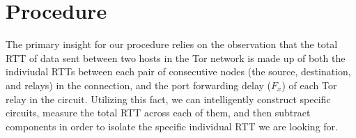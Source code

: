 \documentclass[twocolumn,11pt]{article}
\begin{document}
\section{Procedure}

The primary insight for our procedure relies on the observation that the total RTT of data sent between two hosts in the Tor network is made up of both the indiviudal RTTs between each pair of consecutive nodes (the source, destination, and relays) in the connection, and the port forwarding delay ($F_x$) of each Tor relay in the circuit. Utilizing this fact, we can intelligently construct specific circuits, measure the total RTT across each of them, and then subtract components in order to isolate the specific individual RTT we are looking for. 


\end{document}
